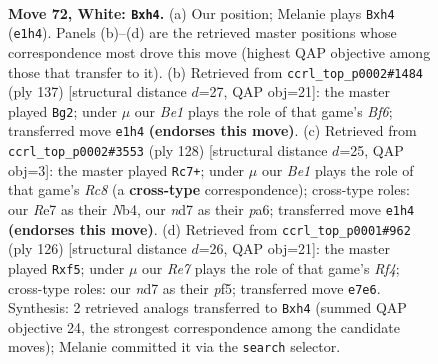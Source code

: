 \documentclass[11pt]{article}
\begin{document}
\clearpage

\begin{figure}[p]\centering
\begin{subfigure}{0.46\textwidth}\centering
\resizebox{\linewidth}{!}{%
\newchessgame
\chessboard[
  setfen={6k1/3nR3/8/3r4/p4P1p/P6P/4K3/4B3 w - - 7 72},
  showmover=false,
  pgfstyle=straightmove, color=movearrow, markmove={e1-h4}
]}
\caption{}
\end{subfigure}\hfill
\begin{subfigure}{0.46\textwidth}\centering
\resizebox{\linewidth}{!}{%
\newchessgame
\chessboard[
  setfen={4k3/8/2r4p/R1N3p1/3K2P1/5b1P/8/8 b - - 0 69},
  showmover=false,
  pgfstyle=straightmove, color=movearrow, markmove={f3-g2}
]}
\caption{}
\end{subfigure}
\\[4pt]
\begin{subfigure}{0.46\textwidth}\centering
\resizebox{\linewidth}{!}{%
\newchessgame
\chessboard[
  setfen={2R5/6kn/p2r4/P7/1N3P2/7P/7K/8 w - - 3 65},
  showmover=false,
  pgfstyle=straightmove, color=movearrow, markmove={c8-c7}
]}
\caption{}
\end{subfigure}\hfill
\begin{subfigure}{0.46\textwidth}\centering
\resizebox{\linewidth}{!}{%
\newchessgame
\chessboard[
  setfen={8/8/2k5/5p1p/4nR1P/r7/6PK/6B1 w - - 0 64},
  showmover=false,
  pgfstyle=straightmove, color=movearrow, markmove={f4-f5}
]}
\caption{}
\end{subfigure}
\caption{\textbf{Move 72, White: \texttt{Bxh4}.} (a) Our position; Melanie plays \texttt{Bxh4} (\texttt{e1h4}). Panels (b)--(d) are the retrieved master positions whose correspondence most drove this move (highest QAP objective among those that transfer to it). (b) Retrieved from \texttt{ccrl\_top\_p0002\#1484} (ply 137) [structural distance $d$=27, QAP obj=21]: the master played \texttt{Bg2}; under $\mu$ our \emph{Be1} plays the role of that game's \emph{Bf6}; transferred move \texttt{e1h4} \textbf{(endorses this move)}. (c) Retrieved from \texttt{ccrl\_top\_p0002\#3553} (ply 128) [structural distance $d$=25, QAP obj=3]: the master played \texttt{Rc7+}; under $\mu$ our \emph{Be1} plays the role of that game's \emph{Rc8} (a \textbf{cross-type} correspondence); cross-type roles: our \emph{R}e7 as their \emph{N}b4, our \emph{n}d7 as their \emph{p}a6; transferred move \texttt{e1h4} \textbf{(endorses this move)}. (d) Retrieved from \texttt{ccrl\_top\_p0001\#962} (ply 126) [structural distance $d$=26, QAP obj=21]: the master played \texttt{Rxf5}; under $\mu$ our \emph{Re7} plays the role of that game's \emph{Rf4}; cross-type roles: our \emph{n}d7 as their \emph{p}f5; transferred move \texttt{e7e6}. Synthesis: 2 retrieved analogs transferred to \texttt{Bxh4} (summed QAP objective 24, the strongest correspondence among the candidate moves); Melanie committed it via the \texttt{search} selector.}
\label{fig:thought-m142}
\end{figure}
\end{document}
